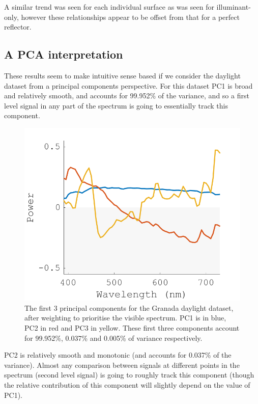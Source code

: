 A similar trend was seen for each individual surface as was seen for illuminant-only, however these relationships appear to be offset from that for a perfect reflector.

\subsection{A PCA interpretation}

These results seem to make intuitive sense based if we consider the daylight dataset from a principal components perspective. For this dataset \gls{PC1} is broad and relatively smooth, and accounts for 99.952\% of the variance, and so a first level signal in any part of the spectrum is going to essentially track this component. 

\begin{figure}[htbp]
 \includegraphics[max width=\textwidth]{figs/comp/melcomp_3/8.png} %
 \caption{The first 3 principal components for the Granada daylight dataset, after weighting to prioritise the visible spectrum. PC1 is in blue, PC2 in red and PC3 in yellow. These first three components account for 99.952\%, 0.037\% and 0.005\% of variance respectively.}
 \label{fig:PCA}
\end{figure} 

\Gls{PC2} is relatively smooth and monotonic (and accounts for 0.037\% of the variance). Almost any comparison between signals at different points in the spectrum (second level signal) is going to roughly track this component (though the relative contribution of this component will slightly depend on the value of \gls{PC1}).

